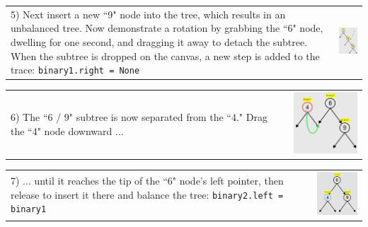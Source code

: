 \noindent \begin{tabular}{m{4.6cm} m{3.4cm}}

5) Next insert a new ``9" node into the tree, which results in an
unbalanced tree. Now demonstrate a rotation by grabbing the ``6" node,
dwelling for one second, and dragging it away to detach the subtree.
When the subtree is dropped on the canvas, a new step is added to the
trace: \texttt{binary1.right = None}

& \includegraphics[width=3.4cm]{img/examples/bst-5.png}
\end{tabular}

\noindent \begin{tabular}{m{4.6cm} m{3.4cm}}

6) The ``6 / 9" subtree is now separated from the ``4." Drag the ``4"
node downward ...

& \includegraphics[width=3.4cm]{img/examples/bst-6.png}
\end{tabular}

\noindent \begin{tabular}{m{4.6cm} m{3.4cm}}

7) ... until it reaches the tip of the ``6" node's left pointer, then
release to insert it there and balance the tree: \texttt{binary2.left =
binary1}

& \includegraphics[width=3.4cm]{img/examples/bst-7.png}
\end{tabular}

